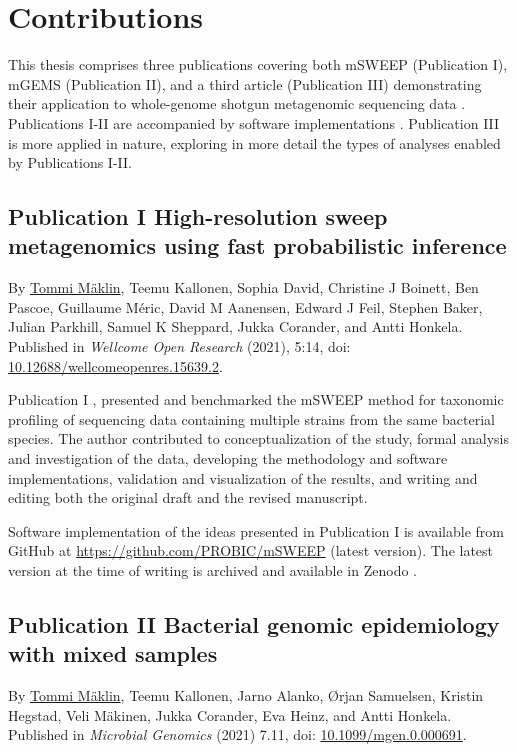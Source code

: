 \documentclass[officiallayout]{tktla}
\begin{document}
\section{Contributions}

This thesis comprises three publications covering both mSWEEP
\citep{maklin_high-resolution_2021} (Publication I), mGEMS
\citep{maklin_bacterial_2021} (Publication II), and a third article
(Publication III) demonstrating their application to whole-genome
shotgun metagenomic sequencing data
\citep{maklin_strong_2022}. Publications I-II are accompanied by
software implementations \citep{maklin_mSWEEP,
  maklin_mGEMS}. Publication III is more applied in nature, exploring
in more detail the types of analyses enabled by Publications I-II.

\subsection*{Publication I \textemdash{ } High-resolution sweep metagenomics using fast probabilistic inference}
By \underline{Tommi M\"aklin}, Teemu Kallonen, Sophia David, Christine J
Boinett, Ben Pascoe, Guillaume M\'eric, David M Aanensen, Edward J Feil,
Stephen Baker, Julian Parkhill, Samuel K Sheppard, Jukka Corander, and
Antti Honkela. Published in \textit{Wellcome Open Research} (2021),
5:14, doi: \href{https://doi.org/10.12688/wellcomeopenres.15639.2}{10.12688/wellcomeopenres.15639.2}.

Publication I \citep{maklin_high-resolution_2021}, presented and
benchmarked the mSWEEP method for taxonomic profiling of sequencing
data containing multiple strains from the same bacterial species. The author
contributed to conceptualization of the study, formal analysis
and investigation of the data, developing the methodology and software
implementations, validation and visualization of the results, and
writing and editing both the original draft and the revised
manuscript.

Software implementation of the ideas presented in Publication I is available
from GitHub at
\href{https://github.com/PROBIC/mSWEEP}{https://github.com/PROBIC/mSWEEP}
(latest version). The latest version at the time of writing is
archived and available in Zenodo \citep{maklin_mSWEEP}.

\subsection*{Publication II \textemdash{ } Bacterial genomic epidemiology with mixed samples}
By \underline{Tommi M\"aklin}, Teemu Kallonen, Jarno Alanko, \O rjan
Samuelsen, Kristin Hegstad, Veli M\"akinen, Jukka Corander, Eva Heinz,
and Antti Honkela. Published in \textit{Microbial Genomics} (2021)
7.11, doi: \href{https://doi.org/10.1099/mgen.0.000691}{10.1099/mgen.0.000691}.
\end{document}

